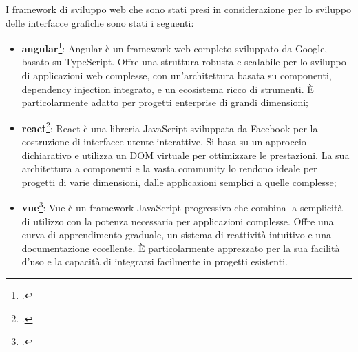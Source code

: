 I framework di sviluppo web che sono stati presi in considerazione per lo sviluppo delle interfacce grafiche sono stati i seguenti:
\begin{itemize}
    \item \textbf{\gls{angular}}\footcite{site:angular}: Angular è un framework web completo sviluppato da Google, basato su TypeScript. Offre una struttura robusta e scalabile per lo sviluppo di applicazioni web complesse, con un'architettura basata su componenti, dependency injection integrato, e un ecosistema ricco di strumenti. È particolarmente adatto per progetti enterprise di grandi dimensioni;
    \item \textbf{\gls{react}}\footcite{site:react}: React è una libreria JavaScript sviluppata da Facebook per la costruzione di interfacce utente interattive. Si basa su un approccio dichiarativo e utilizza un DOM virtuale per ottimizzare le prestazioni. La sua architettura a componenti e la vasta community lo rendono ideale per progetti di varie dimensioni, dalle applicazioni semplici a quelle complesse;
    \item \textbf{\gls{vue}}\footcite{site:vue}: Vue è un framework JavaScript progressivo che combina la semplicità di utilizzo con la potenza necessaria per applicazioni complesse. Offre una curva di apprendimento graduale, un sistema di reattività intuitivo e una documentazione eccellente. È particolarmente apprezzato per la sua facilità d'uso e la capacità di integrarsi facilmente in progetti esistenti.
\end{itemize}

